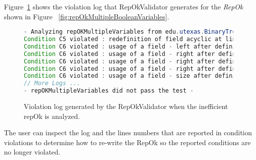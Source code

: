 
\para Figure~\ref{fig:repOkKoratSatisfyEfficiencyLog} shows the
violation log that RepOkValidator generates for the \emph{RepOk} shown
in Figure~ \ref{fig:repOkMultipleBooleanVariables}.

\begin{figure}
\centering
\begin{lstlisting}[language=Java]
- Analyzing repOKMultipleVariables from edu.utexas.BinaryTree -
Condition C5 violated : redefinition of field acyclic at line 91 inside repOKMultipleVariables in edu.utexas.BinaryTree.java
Condition C6 violated : usage of a field - left after defining return value from class edu.utexas.BinaryTree$Node at line 87 inside repOKMultipleVariables in edu.utexas.BinaryTree.java
Condition C6 violated : usage of a field - right after defining return value from class edu.utexas.BinaryTree$Node at line 89 inside repOKMultipleVariables in edu.utexas.BinaryTree.java
Condition C6 violated : usage of a field - right after defining return value from class edu.utexas.BinaryTree$Node at line 90 inside repOKMultipleVariables in edu.utexas.BinaryTree.java
Condition C6 violated : usage of a field - right after defining return value from class edu.utexas.BinaryTree$Node at line 92 inside repOKMultipleVariables in edu.utexas.BinaryTree.java
Condition C6 violated : usage of a field - size after defining return value from class edu.utexas.BinaryTree at line 96 inside repOKMultipleVariables in edu.utexas.BinaryTree.java
// More Logs ...
- repOKMultipleVariables did not pass the test -
\end{lstlisting}
\caption{Violation log generated by the RepOkValidator when the inefficient repOk is analyzed.}
\label{fig:repOkKoratSatisfyEfficiencyLog}
\end{figure}

The user can inspect the log and the lines numbers that are reported
in condition violations to determine how to re-write the RepOk so the
reported conditions are no longer violated.
